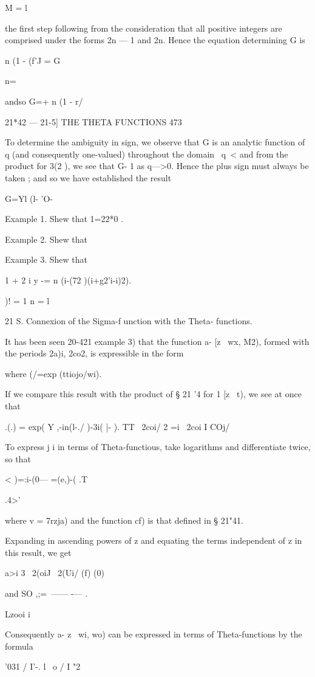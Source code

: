 M = l

the first step following from the consideration that all positive
integers are comprised under the forms 2n — 1 and 2n. Hence the
equation determining G is

n (1 - (f'J = G\

n=\

andso G=+ n (1 - r/

21*42 — 21-5] THE THETA FUNCTIONS 473

To determine the ambiguity in sign, we observe that G is an analytic
function of q (and consequently one-valued) throughout the domain \ q\
< \; and from the product for 3(2 ), we see that G- 1 as q—>0. Hence
the plus sign must always be taken ; and so we have established the
result

G=Yl (l- 'O-

Example 1. Shew that 1=22*0 .

Example 2. Shew that

Example 3. Shew that

1 + 2 i y -= n (i-(72 )(i+g2'i-i)2).

)! = 1 n = l

21 S. Connexion of the Sigma-f unction with the Theta- functions.

It has been seen 20-421 example 3) that the function a- [z \ wx, M2),
formed with the periods 2a)i, 2co2, is expressible in the form

where (/=exp (ttiojo/wi).

If we compare this result with the product of § 21 '4 for 1 [z \ t),
we see at once that

.(.) = exp( Y ,-in(l-./ )-3i( |- ). TT \ 2coi/ 2 =i \ 2coi I COj/

To express j i in terms of Theta-functious, take logarithms and
differentiate twice, so that

 < )=:i-(0— =(e,)-( .T

.4>'

where v = 7rzja) and the function cf) is that defined in § 21"41.

Expanding in ascending powers of z and equating the terms independent
of z in this result, we get

a>i 3 \ 2(oiJ \ 2(Ui/ (f) (0)

and SO ,;=\ —— -— .

Lzooi i

Consequently a- z \ wi, wo) can be expressed in terms of
Theta-functions by the formula

'031 / I'-. l \ o / I "2

